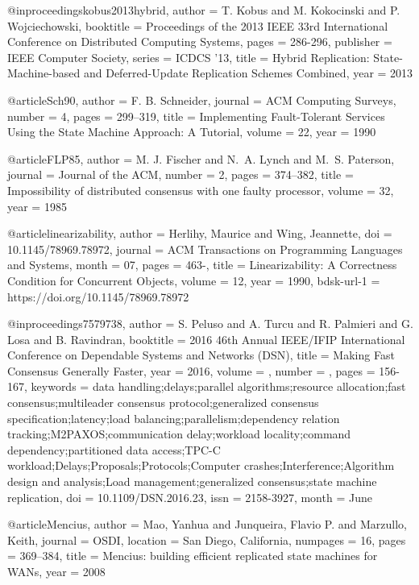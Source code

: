 @inproceedings{kobus2013hybrid,
  author    = {T. Kobus and M. Kokocinski and P. Wojciechowski},
  booktitle = {Proceedings of the 2013 IEEE 33rd International Conference on Distributed Computing Systems},
  pages     = {286-296},
  publisher = {{IEEE} Computer Society},
  series    = {ICDCS '13},
  title     = {Hybrid Replication: State-Machine-based and Deferred-Update Replication Schemes Combined},
  year      = {2013}
}

@article{Sch90,
  author  = {F. B. Schneider},
  journal = {ACM Computing Surveys},
  number  = {4},
  pages   = {299--319},
  title   = {Implementing Fault-Tolerant Services Using the State Machine Approach: {A} Tutorial},
  volume  = {22},
  year    = {1990}
}

@article{FLP85,
  author  = {M. J. Fischer and N.~A. Lynch and M.~S. Paterson},
  journal = {Journal of the ACM},
  number  = {2},
  pages   = {374--382},
  title   = {Impossibility of distributed consensus with one faulty processor},
  volume  = {32},
  year    = {1985}
}

@article{linearizability,
  author     = {Herlihy, Maurice and Wing, Jeannette},
  doi        = {10.1145/78969.78972},
  journal    = {ACM Transactions on Programming Languages and Systems},
  month      = {07},
  pages      = {463-},
  title      = {Linearizability: A Correctness Condition for Concurrent Objects},
  volume     = {12},
  year       = {1990},
  bdsk-url-1 = {https://doi.org/10.1145/78969.78972}
}

@inproceedings{7579738,
  author    = {S. {Peluso} and A. {Turcu} and R. {Palmieri} and G. {Losa} and B. {Ravindran}},
  booktitle = {2016 46th Annual IEEE/IFIP International Conference on Dependable Systems and Networks (DSN)},
  title     = {Making Fast Consensus Generally Faster},
  year      = {2016},
  volume    = {},
  number    = {},
  pages     = {156-167},
  keywords  = {data handling;delays;parallel algorithms;resource allocation;fast consensus;multileader consensus protocol;generalized consensus specification;latency;load balancing;parallelism;dependency relation tracking;M2PAXOS;communication delay;workload locality;command dependency;partitioned data access;TPC-C workload;Delays;Proposals;Protocols;Computer crashes;Interference;Algorithm design and analysis;Load management;generalized consensus;state machine replication},
  doi       = {10.1109/DSN.2016.23},
  issn      = {2158-3927},
  month     = {June}
}

@article{Mencius,
  author   = {Mao, Yanhua and Junqueira, Flavio P. and Marzullo, Keith},
  journal  = {OSDI},
  location = {San Diego, California},
  numpages = {16},
  pages    = {369--384},
  title    = {Mencius: building efficient replicated state machines for WANs},
  year     = {2008}
}

